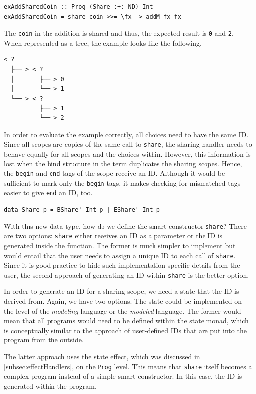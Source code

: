 \documentclass[a4paper, 11pt, fleqn, twoside]{scrreprt}
\newcommand{\hinl}[1]{\texttt{#1}}
\begin{document}
\begin{verbatim}
exAddSharedCoin :: Prog (Share :+: ND) Int
exAddSharedCoin = share coin >>= \fx -> addM fx fx
\end{verbatim}

The \hinl{coin} in the addition is shared and thus, the expected result is \hinl{0} and \hinl{2}.
When represented as a tree, the example looks like the following.

\begin{verbatim}
< ? 
  ├── > < ? 
  │       ├── > 0
  │       └── > 1
  └── > < ? 
          ├── > 1
          └── > 2
\end{verbatim}

In order to evaluate the example correctly, all choices need to have the same ID.
Since all scopes are copies of the same call to \hinl{share}, the sharing handler needs to behave equally for all scopes and the choices within.
However, this information is lost when the bind structure in the term duplicates the sharing scopes.
Hence, the \hinl{begin} and \hinl{end} tags of the scope receive an ID.
Although it would be sufficient to mark only the \hinl{begin} tags, it makes checking for mismatched tags easier to give \hinl{end} an ID, too.

\begin{verbatim}
data Share p = BShare' Int p | EShare' Int p
\end{verbatim}

With this new data type, how do we define the smart constructor \hinl{share}?
There are two options: \hinl{share} either receives an ID as a parameter or the ID is generated inside the function.
The former is much simpler to implement but would entail that the user needs to assign a unique ID to each call of \hinl{share}.
Since it is good practice to hide such implementation-specific details from the user, the second approach of generating an ID within \hinl{share} is the better option.

In order to generate an ID for a sharing scope, we need a state that the ID is derived from.
Again, we have two options.
The state could be implemented on the level of the \textit{modeling} language or the \textit{modeled} language.
The former would mean that all programs would need to be defined within the state monad, which is conceptually similar to the approach of user-defined IDs that are put into the program from the outside.

The latter approach uses the state effect, which was discussed in \autoref{subsec:effectHandlers},  on the \hinl{Prog} level.
This means that \hinl{share} itself becomes a complex program instead of a simple smart constructor.
In this case, the ID is generated within the program.
\end{document}

